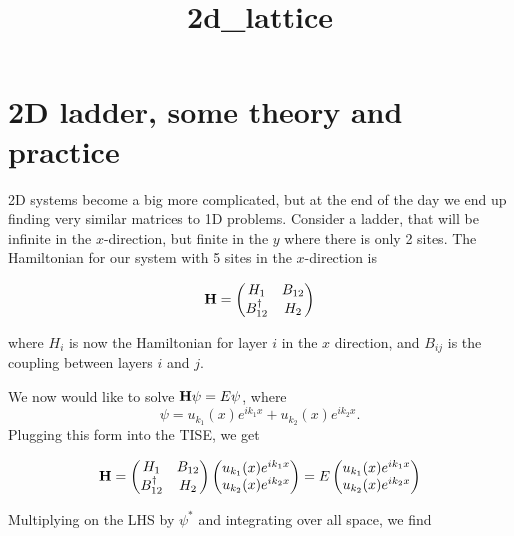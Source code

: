 \documentclass[11pt]{article}
\title{2d\_lattice}
\begin{document}
    
    
    \maketitle
    
    

    
    \section{2D ladder, some theory and
practice}\label{d-ladder-some-theory-and-practice}

2D systems become a big more complicated, but at the end of the day we
end up finding very similar matrices to 1D problems. Consider a ladder,
that will be infinite in the \(x\)-direction, but finite in the \(y\)
where there is only 2 sites. The Hamiltonian for our system with 5 sites
in the \(x\)-direction is

\begin{equation}
{\bf H}=
\begin{pmatrix}
H_1 & B_{12} \\
B_{12}^{\dagger} & H_2
\end{pmatrix}
\end{equation}

where \(H_i\) is now the Hamiltonian for layer \(i\) in the \(x\)
direction, and \(B_{ij}\) is the coupling between layers \(i\) and
\(j\).

We now would like to solve \({\bf H}\psi = E\psi\), where \[
\psi=u_{k_1}(x)e^{ik_1x} + u_{k_2}(x)e^{ik_2x}.
\] Plugging this form into the TISE, we get

\begin{equation}
{\bf H}=
\begin{pmatrix}
 H_1 &  B_{12} \\
 B_{12}^{\dagger} & H_2
\end{pmatrix}
\begin{pmatrix}
u_{k_1}(x)e^{ik_1x} \\
u_{k_2}(x)e^{ik_2x}
\end{pmatrix}=
E\begin{pmatrix}
u_{k_1}(x)e^{ik_1x} \\
u_{k_2}(x)e^{ik_2x}
\end{pmatrix}
\end{equation}

Multiplying on the LHS by \(\psi^*\) and integrating over all space, we
find
\end{document}
